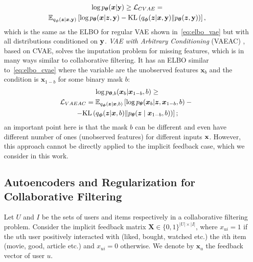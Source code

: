 \documentclass[sigconf,authorversion]{acmart}
\newcommand{\KL}[2]{\mathrm{KL}\left(#1 \middle\| #2\right)}
\def\x{{\bf x}}
\def\bz{{\bf z}}
\def\by{{\bf y}}
\def\btheta{{\boldsymbol{\theta}}}
\def\bphi{{\boldsymbol{\phi}}}
\def\bz{\boldsymbol{z}}
\def\bx{\boldsymbol{x}}
\begin{document}
\begin{multline}\label{eq:elbo_cvae}
    \log p_{\btheta}(\bx|\by) \ge \mathcal{L}_{CVAE} = \\
    \mathbb{E}_{q_{\bphi}(\bz|\bx, \by)}\left[\log p_{\btheta}(\bx|\bz, \by) - \KL{q_{\bphi}(\bz|\bx, \by)}{p_{\btheta}(\bz, \by)}\right],
\end{multline}
which is the same as the ELBO for regular VAE shown in~\eqref{eq:elbo_vae} but with all distributions conditioned on $\by$. \emph{VAE with Arbitrary Conditioning} (VAEAC) \cite{DBLP:conf/iclr/IvanovFV19}, based on CVAE, solves the imputation problem for missing features, which is in many ways similar to collaborative filtering. It has an ELBO similar to~\eqref{eq:elbo_cvae} where the variable are the unobserved features $\bx_b$ and the condition is $\bx_{1-b}$ for some binary mask $b$:
\begin{multline}\label{eq:elbo_vaeac}
    \log p_{\btheta,b}(\bx_b|\bx_{1-b}, b) \ge \\ \mathcal{L}_{VAEAC} = 
    \mathbb{E}_{q_{\bphi}(\bz|\bx, b)}\left[\log p_{\btheta}(\bx_b|\bz, \bx_{1-b}, b) - \vphantom{\KL{q_{\bphi}(\bz|\bx, b)}{p_{\btheta}(\bz\mid \bx_{1-b}, b)}} \right. \\
    \left. - \KL{q_{\bphi}(\bz|\bx, b)}{p_{\btheta}(\bz\mid \bx_{1-b}, b)}\right];
\end{multline}
an important point here is that the mask $b$ can be different and even have different number of ones (unobserved features) for different inputs $\x$. However, this approach cannot be directly applied to the implicit feedback case, which we consider in this work.

\subsection{Autoencoders and Regularization for Collaborative Filtering}\label{sec:ae_cf}

Let $U$ and $I$ be the sets of users and items respectively in a collaborative filtering problem. Consider the implicit feedback matrix $\mathbf{X} \in \{0, 1\}^{|U| \times |I|}$, where $x_{ui} = 1$ if the $u$th user positively interacted with (liked, bought, watched etc.) the $i$th item (movie, good, article etc.) and $x_{ui}=0$ otherwise. We denote by $\bx_u$ the feedback vector of user $u$.
\end{document}
